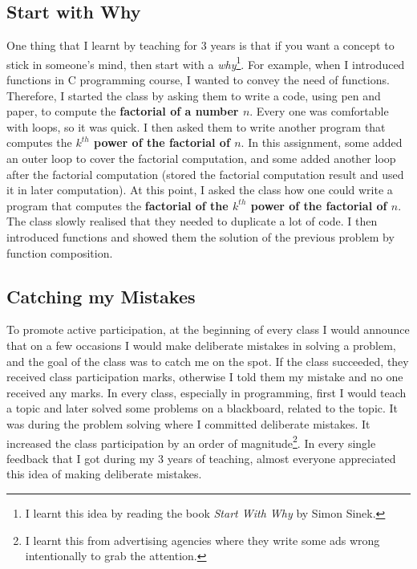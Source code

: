 \documentclass[a4paper]{article}
\begin{document}
\subsection{Start with Why}
One thing that I learnt by teaching for 3 years is that if you want a concept 
to stick in someone's mind, then start with a \textit{why}\footnote{I learnt this idea by reading the book 
\textit{Start With Why} by Simon Sinek.}. For example, when I introduced functions 
in C programming course, I wanted to convey the need of functions. Therefore, I started the class by 
asking them to write a code, using pen and paper, to compute the \textbf{factorial of a number $n$}. 
Every one was comfortable with loops, so it was quick. I then asked them to write 
another program that computes the \textbf{$k^{th}$ power of the factorial of $n$}. 
In this assignment, some added an outer loop to cover the factorial computation, 
and some added another loop after the factorial computation (stored the factorial 
computation result and used it in later computation). 
At this point, I asked the class 
how one could write a program that computes the \textbf{factorial of 
the $k^{th}$ power of the factorial of $n$}. The class slowly realised 
that they needed to duplicate a lot of code. I then introduced functions 
and showed them the solution of the previous problem by function composition.


\subsection{Catching my Mistakes}
To promote active participation, at the beginning of every class I would announce that 
on a few occasions I would make deliberate mistakes in solving a problem, and the
goal of the class was to catch me on the spot.
If the class succeeded, they received  
class participation marks, otherwise I told them my 
mistake and no one received any marks.
In every class, especially in programming, 
first I would teach a topic and later solved some problems on 
a blackboard, related to the topic. 
It was during the problem solving where I committed deliberate mistakes.
It increased the class participation by an order of 
magnitude\footnote{I learnt this 
from advertising agencies where they write some ads wrong 
intentionally to grab the attention.}. In every single 
feedback that I got during my 3 years of teaching, 
almost everyone appreciated this idea of making deliberate mistakes. 
\end{document}
